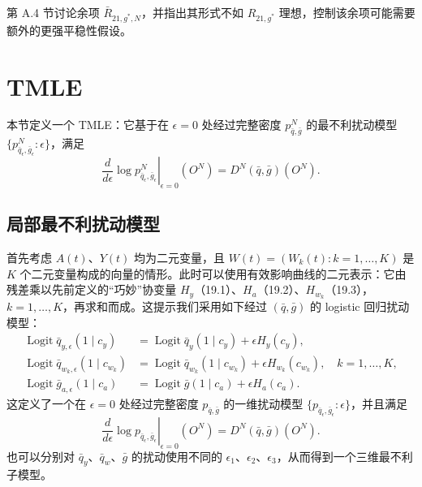 第 A.4 节讨论余项 $\bar R_{21,g^*,N}$，并指出其形式不如 $R_{21,g^*}$ 理想，控制该余项可能需要额外的更强平稳性假设。

\section{TMLE}

本节定义一个 TMLE：它基于在 $\epsilon=0$ 处经过完整密度 $p^N_{\bar q,\bar g}$ 的最不利扰动模型 $\{p^N_{\bar q_\epsilon,\bar g_\epsilon}:\epsilon\}$，满足
\begin{equation}
 \left.\frac d{d\epsilon}\log p^N_{\bar q_\epsilon,\bar g_\epsilon}
 \right|_{\epsilon=0}(O^N)=D^N(\bar q,\bar g)(O^N).
 \tag{19.4}
\end{equation}

\subsection{局部最不利扰动模型}

首先考虑 $A(t)$、$Y(t)$ 均为二元变量，且 $W(t)=(W_k(t):k=1,\ldots,K)$ 是 $K$ 个二元变量构成的向量的情形。此时可以使用有效影响曲线的二元表示：它由残差乘以先前定义的“巧妙”协变量 $H_y$（19.1）、$H_a$（19.2）、$H_{w_k}$（19.3），$k=1,\ldots,K$，再求和而成。这提示我们采用如下经过 $(\bar q,\bar g)$ 的 logistic 回归扰动模型：
\[
\begin{aligned}
 \operatorname{Logit}\bar q_{y,\epsilon}(1\mid c_y)
 &=\operatorname{Logit}\bar q_y(1\mid c_y)+\epsilon H_y(c_y),\\
 \operatorname{Logit}\bar q_{w_k,\epsilon}(1\mid c_{w_k})
 &=\operatorname{Logit}\bar q_{w_k}(1\mid c_{w_k})+\epsilon H_{w_k}(c_{w_k}),
 \quad k=1,\ldots,K,\\
 \operatorname{Logit}\bar g_{a,\epsilon}(1\mid c_a)
 &=\operatorname{Logit}\bar g(1\mid c_a)+\epsilon H_a(c_a).
\end{aligned}
\]
这定义了一个在 $\epsilon=0$ 处经过完整密度 $p_{\bar q,\bar g}$ 的一维扰动模型 $\{p_{\bar q_\epsilon,\bar g_\epsilon}:\epsilon\}$，并且满足
\begin{equation}
 \left.\frac d{d\epsilon}\log p_{\bar q_\epsilon,\bar g_\epsilon}
 \right|_{\epsilon=0}(O^N)=D^N(\bar q,\bar g)(O^N).
 \tag{19.5}
\end{equation}
也可以分别对 $\bar q_y$、$\bar q_w$、$\bar g$ 的扰动使用不同的 $\epsilon_1$、$\epsilon_2$、$\epsilon_3$，从而得到一个三维最不利子模型。

